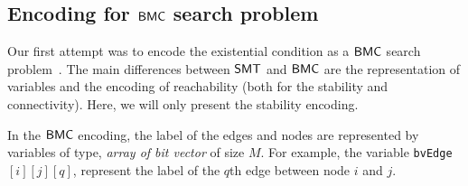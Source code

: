 \subsection{Encoding for $\mathsf{BMC}$ search problem}

\noindent Our first attempt was to encode the existential condition as a $\mathsf{BMC}$ search problem~\cite{shukla2017discovering}.
%
%
%
%
% 
The main differences between $\mathsf{SMT}$ and $\mathsf{BMC}$ are the representation of variables and the encoding of 
reachability (both for the stability and connectivity).  
Here, we will only present the stability encoding.

In the $\mathsf{BMC}$ encoding, the label of the edges and nodes are represented by variables of type, \textit{array of bit vector} of size $M$. 
%
For example, the variable \texttt{bvEdge}$[i][j][q]$, represent the label of the $q$th edge between node $i$ and $j$.

